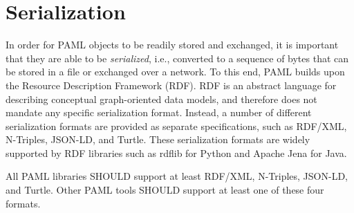 \section{Serialization}
\label{sec:serialization}

In order for PAML objects to be readily stored and exchanged, it is important that they are able to be {\em serialized}, i.e., converted to a sequence of bytes that can be stored in a file or exchanged over a network.  
%
To this end, PAML builds upon the Resource Description Framework (RDF).  RDF is an abstract language for describing conceptual graph-oriented data models, and therefore does not mandate any specific serialization format.  Instead, a number of different serialization formats are provided as separate specifications, such as RDF/XML, N-Triples, JSON-LD, and Turtle.  These serialization formats are widely supported by RDF libraries such as rdflib for Python and Apache Jena for Java.

All PAML libraries SHOULD support at least RDF/XML, N-Triples, JSON-LD, and Turtle.
Other PAML tools SHOULD support at least one of these four formats.
